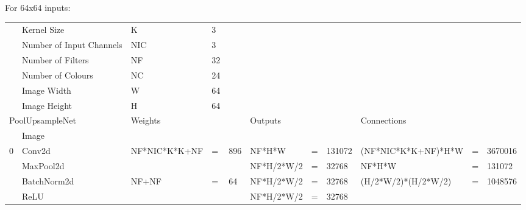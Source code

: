 \documentclass{article}
\begin{document}
For 64x64 inputs:


\begin{tiny}
\setlength\tabcolsep{1.5pt}
\begin{tabular}{@{}lllllllllll@{}}
\toprule
      & Kernel Size                 & K                    & 3  &       &                &   &        &                                &   &          \\ 
      & Number of Input Channels    & NIC                  & 3  &       &                &   &        &                                &   &          \\
      & Number of Filters           & NF                   & 32 &       &                &   &        &                                &   &          \\
      & Number of Colours           & NC                   & 24 &       &                &   &        &                                &   &          \\
      & Image Width                 & W                    & 64 &       &                &   &        &                                &   &          \\
      & Image Height                & H                    & 64 &       &                &   &        &                                &   &          \\\midrule
\multicolumn{2}{l}{PoolUpsampleNet} & \multicolumn{3}{l}{Weights}       & \multicolumn{3}{l}{Outputs} & \multicolumn{3}{l}{Connections}               \\\midrule
      & Image                       &                      &    &       &                &   &        &                                &   &          \\
0     & Conv2d                      & NF*NIC*K*K+NF        & =  & 896   & NF*H*W         & = & 131072 & (NF*NIC*K*K+NF)*H*W            & = & 3670016  \\
      & MaxPool2d                   &                      &    &       & NF*H/2*W/2     & = & 32768  & NF*H*W                         & = & 131072   \\
      & BatchNorm2d                 & NF+NF                & =  & 64    & NF*H/2*W/2     & = & 32768  & (H/2*W/2)*(H/2*W/2)            & = & 1048576  \\
      & ReLU                        &                      &    &       & NF*H/2*W/2     & = & 32768  &                                &   &          \\

\end{tabular}
\end{tiny}
\end{document}
